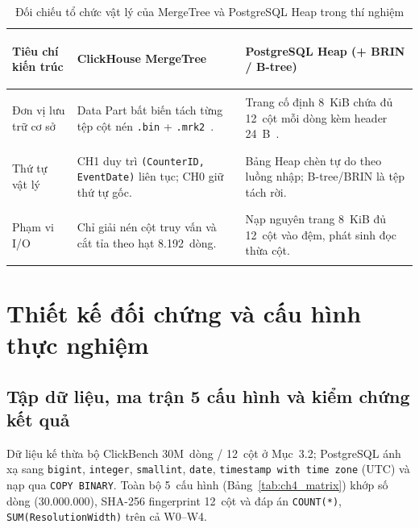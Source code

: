 \documentclass[13pt,a4paper]{report}
\begin{document}
\begin{table}[!htb]
\centering
\scriptsize
\renewcommand{\arraystretch}{1.08}
\caption{Đối chiếu tổ chức vật lý của MergeTree và PostgreSQL Heap trong thí nghiệm}
\label{tab:ch4_physical_storage}
\begin{tabularx}{\textwidth}{>{\bfseries\raggedright\arraybackslash}p{3.0cm} >{\raggedright\arraybackslash}X >{\raggedright\arraybackslash}X}
\toprule
\textbf{Tiêu chí kiến trúc} & \textbf{ClickHouse MergeTree} & \textbf{PostgreSQL Heap (+ BRIN / B-tree)} \\
\midrule
Đơn vị lưu trữ cơ sở & Data Part bất biến tách từng tệp cột nén \texttt{.bin} + \texttt{.mrk2}~\cite{S2, S3}. & Trang cố định 8~KiB chứa đủ 12~cột mỗi dòng kèm header 24~B~\cite{P1}. \\
\addlinespace[2pt]
Thứ tự vật lý & CH1 duy trì \texttt{(\allowbreak{}CounterID, EventDate)} liên tục; CH0 giữ thứ tự gốc. & Bảng Heap chèn tự do theo luồng nhập; B-tree/BRIN là tệp tách rời. \\
\addlinespace[2pt]
Phạm vi I/O & Chỉ giải nén cột truy vấn và cắt tỉa theo hạt 8.192~dòng. & Nạp nguyên trang 8~KiB đủ 12~cột vào đệm, phát sinh đọc thừa cột. \\
\bottomrule
\end{tabularx}
\end{table}

\section{Thiết kế đối chứng và cấu hình thực nghiệm}

\subsection{Tập dữ liệu, ma trận 5 cấu hình và kiểm chứng kết quả}
Dữ liệu kế thừa bộ ClickBench 30M~dòng / 12~cột ở Mục~3.2; PostgreSQL ánh xạ sang \texttt{bigint}, \texttt{integer}, \texttt{smallint}, \texttt{date}, \texttt{timestamp with time zone} (UTC) và nạp qua \texttt{COPY BINARY}. Toàn bộ 5~cấu hình (Bảng~\ref{tab:ch4_matrix}) khớp số dòng (30.000.000), SHA-256 fingerprint 12~cột và đáp án \texttt{COUNT(*)}, \texttt{SUM(\allowbreak{}ResolutionWidth)} trên cả W0--W4.
\end{document}
